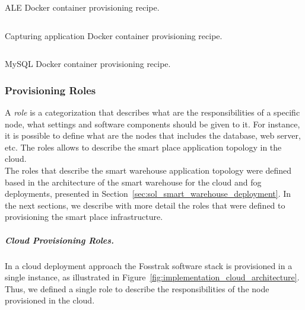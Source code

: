 \begin{listing}[ht!]
\inputminted[frame=lines,
             framesep=3mm,
             linenos=true,
             xleftmargin=21pt,
             tabsize=4]{ruby}{./listings/ale_recipe.rb}
\caption{ALE Docker container provisioning recipe.}
\label{listing:ale_recipe}
\end{listing}

\begin{listing}[ht!]
\inputminted[frame=lines,
             framesep=3mm,
             linenos=true,
             xleftmargin=21pt,
             tabsize=4]{ruby}{./listings/capture_recipe.rb}
\caption{Capturing application Docker container provisioning recipe.}
\label{listing:capture_recipe}
\end{listing}

\begin{listing}[ht!]
\inputminted[frame=lines,
             framesep=3mm,
             linenos=true,
             xleftmargin=21pt,
             tabsize=4]{ruby}{./listings/db_recipe.rb}
\caption{MySQL Docker container provisioning recipe.}
\label{listing:db_recipe}
\end{listing}

\subsubsection{Provisioning Roles}
\label{subs:provisioning_roles}
A \textit{role} is a categorization that describes what are the responsibilities of a specific
node, what settings and software components should be given to it. For instance, it is possible
to define what are the nodes that includes the database, web server, etc. The roles allows to describe
the smart place application topology in the cloud.\\

The roles that describe the smart warehouse application topology were defined based in the
architecture of the smart warehouse for the cloud and fog deployments, presented in Section~\ref{sec:sol_smart_warehouse_deployment}.
In the next sections, we describe with more detail the roles that were defined to provisioning the
smart place infrastructure.

\subparagraph{Cloud Provisioning Roles.}
\label{subp:cloud_roles}
In a cloud deployment approach the Fosstrak software stack is provisioned in a single instance, as
illustrated in Figure~\ref{fig:implementation_cloud_architecture}. Thus, we defined a single role
to describe the responsibilities of the node provisioned in the cloud.\\

